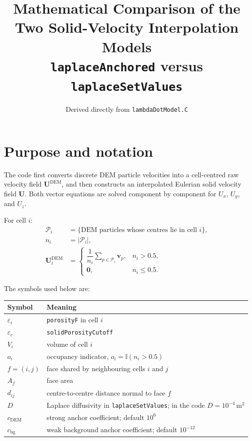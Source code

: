 \documentclass[11pt,a4paper]{article}
\title{\textbf{Mathematical Comparison of the Two Solid-Velocity Interpolation Models}\\
\large \texttt{laplaceAnchored} versus \texttt{laplaceSetValues}}
\author{Derived directly from \texttt{lambdaDotModel.C}}
\date{}
\newcommand{\U}{\bm{U}}
\newcommand{\Ud}{\bm{U}^{\mathrm{DEM}}}
\newcommand{\epsp}{\varepsilon}
\newcommand{\ind}{\mathbb{I}}
\begin{document}
\maketitle

\section{Purpose and notation}

The code first converts discrete DEM particle velocities into a cell-centred raw velocity field
$\Ud$, and then constructs an interpolated Eulerian solid velocity field $\U$.
Both vector equations are solved component by component for $U_x$, $U_y$, and $U_z$.

For cell $i$:
\begin{align}
\mathcal{P}_i
&= \{\text{DEM particles whose centres lie in cell }i\},\\
n_i
&= |\mathcal{P}_i|,\\
\Ud_i
&=
\begin{cases}
\dfrac{1}{n_i}\displaystyle\sum_{p\in\mathcal{P}_i}\bm{v}_p,
& n_i>0.5,\\[1.2ex]
\bm{0}, & n_i\le 0.5.
\end{cases}
\label{eq:rawdem}
\end{align}

The symbols used below are:
\begin{center}
\begin{tabularx}{0.96\textwidth}{L{2.5cm}Y}
\toprule
Symbol & Meaning\\
\midrule
$\epsp_i$ & \texttt{porosityF} in cell $i$\\
$\epsp_c$ & \texttt{solidPorosityCutoff}\\
$V_i$ & volume of cell $i$\\
$o_i$ & occupancy indicator, $o_i=\ind(n_i>0.5)$\\
$f=(i,j)$ & face shared by neighbouring cells $i$ and $j$\\
$A_f$ & face area\\
$d_{ij}$ & centre-to-centre distance normal to face $f$\\
$D$ & Laplace diffusivity in \texttt{laplaceSetValues}; in the code $D=10^{-4}\,\mathrm{m^2}$\\
$c_{\mathrm{DEM}}$ & strong anchor coefficient; default $10^6$\\
$c_{\mathrm{bg}}$ & weak background anchor coefficient; default $10^{-12}$\\
\bottomrule
\end{tabularx}
\end{center}
\end{document}
